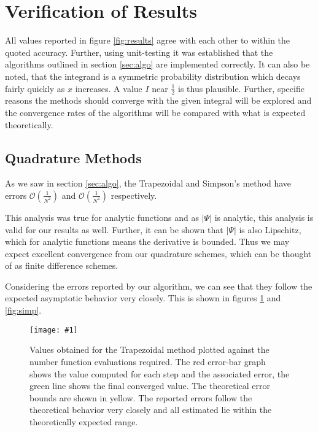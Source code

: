 \documentclass[10pt, a4paper]{article}
\newcommand{\plot}[3]{\begin{figure}[ht]\centering\texttt{[image: \#1]}\caption{#2}\label{#3}\end{figure}}
\begin{document}

\section{Verification of Results}
\label{sec:verify}


  All values reported in figure \ref{fig:results} agree with each other to within the quoted accuracy.
  Further, using unit-testing it was established that the algorithms outlined in section \ref{sec:algo}
  are implemented correctly. It can also be noted, that the integrand is a symmetric probability distribution
  which decays fairly quickly as $x$ increases. A value $I$ near $\frac12$ is thus plausible. Further,
  specific reasons the methods should converge with the given integral will be explored and the
  convergence rates of the algorithms will be compared with what is expected theoretically.

  \subsection{Quadrature Methods}
  As we saw in section \ref{sec:algo}, the Trapezoidal and Simpson's method have errors
  $\mathcal{O}\left( \frac{1}{N^2} \right)$ and $\mathcal{O}\left( \frac{1}{N^4} \right)$ respectively.

  This analysis was true for analytic functions and as $|\Psi|$ is analytic, this analysis is valid
  for our results as well. Further, it can be shown that $|\Psi|$ is also Lipschitz, which for analytic
  functions means the derivative is bounded. Thus we may expect excellent convergence from our
  quadrature schemes, which can be thought of as finite difference schemes.

  Considering the errors reported by our algorithm, we can see that they follow the expected asymptotic
  behavior very closely. This is shown in figures \ref{fig:trap} and \ref{fig:simp}.

  \plot{proj-trap-accuracy}{
    Values obtained for the Trapezoidal method plotted against the number function evaluations required. The red
    error-bar graph shows the value computed for each step and the associated error, the green line
    shows the final converged value. The theoretical error bounds are shown in yellow. The reported errors
    follow the theoretical behavior very closely and all estimated lie within the theoretically expected range.
  }{fig:trap}
\end{document}
